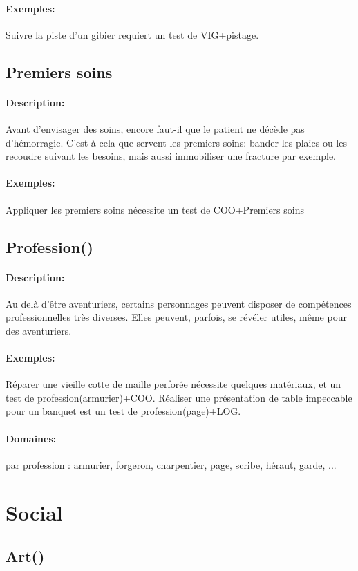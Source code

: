 \documentclass[10pt,a4paper,twocolumn]{book}
\begin{document}
\paragraph{Exemples:}Suivre la piste d'un gibier requiert un test de VIG+pistage.
\subsection{Premiers soins}
\paragraph{Description:}Avant d'envisager des soins, encore faut-il que le patient ne décède pas d'hémorragie. C'est à cela que servent les premiers soins: bander les plaies ou les recoudre suivant les besoins, mais aussi immobiliser une fracture par exemple.
\paragraph{Exemples:}Appliquer les premiers soins nécessite un test de COO+Premiers soins
\subsection{Profession()}
\paragraph{Description:}Au delà d'être aventuriers, certains personnages peuvent disposer de compétences professionnelles très diverses. Elles peuvent, parfois, se révéler utiles, même pour des aventuriers.
\paragraph{Exemples:}Réparer une vieille cotte de maille perforée nécessite quelques matériaux, et un test de profession(armurier)+COO. Réaliser une présentation de table impeccable pour un banquet est un test de profession(page)+LOG.
\paragraph{Domaines:}par profession : armurier, forgeron, charpentier, page, scribe, héraut, garde, ...

\section{Social}
\subsection{Art()}
\end{document}
